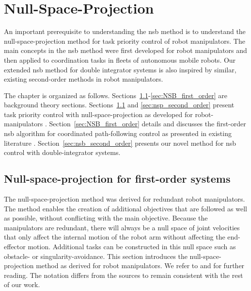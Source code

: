 \chapter{Null-Space-Projection}\label{cha:nsp}
An important prerequisite to understanding the \gls{nsb} method is to understand the null-space-projection method for task priority control of robot manipulators. The main concepts in the \gls{nsb} method were first developed for robot manipulators and then applied to coordination tasks in fleets of autonomous mobile robots. Our extended \gls{nsb} method for double integrator systems is also inspired by similar, existing second-order methods in robot manipulators. 

The chapter is organized as follows. Sections~\ref{sec:nsp_first_order}-\ref{sec:NSB_first_order} are background theory sections. Sections~\ref{sec:nsp_first_order} and \ref{sec:nsp_second_order} present task priority control with null-space-projection as developed for robot-manipulators \citep{siciliano_differential_2009, chiaverini_kinematically_2008}. Section~\ref{sec:NSB_first_order} details and discusses the first-order \gls{nsb} algorithm for coordinated path-following control as presented in existing literature \citep{arrichiello_formation_2006, antonelli_kinematic_2006, matous_singularity-free_2022}. Section~\ref{sec:nsb_second_order} presents our novel method for \gls{nsb} control with double-integrator systems.


\section{Null-space-projection for first-order systems}\label{sec:nsp_first_order}
The null-space-projection method was derived for redundant robot manipulators. The method enables the creation of additional objectives that are followed as well as possible, without conflicting with the main objective. Because the manipulators are redundant, there will always be a null space of joint velocities that only affect the internal motion of the robot arm without affecting the end-effector motion. Additional tasks can be constructed in this null space such as obstacle- or singularity-avoidance. This section introduces the null-space-projection method as derived for robot manipulators. We refer to \cite{siciliano_differential_2009} and \cite{chiaverini_kinematically_2008} for further reading. The notation differs from the sources to remain consistent with the rest of our work.

